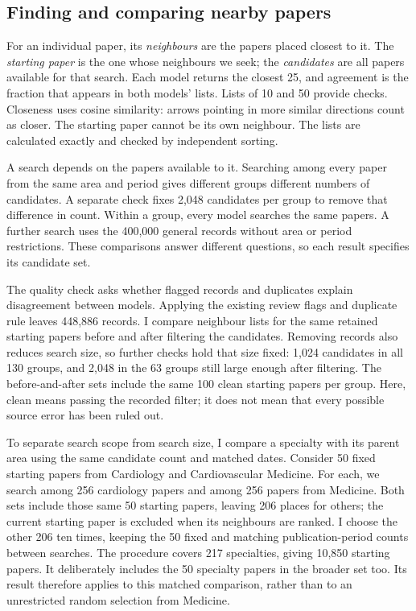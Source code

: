 \documentclass[12pt]{article}
\begin{document}
\subsection{Finding and comparing nearby papers}
For an individual paper, its \emph{neighbours} are the papers placed closest to it. The \emph{starting paper} is the one whose neighbours we seek; the \emph{candidates} are all papers available for that search. Each model returns the closest 25, and agreement is the fraction that appears in both models' lists. Lists of 10 and 50 provide checks. Closeness uses cosine similarity: arrows pointing in more similar directions count as closer. The starting paper cannot be its own neighbour. The lists are calculated exactly and checked by independent sorting.

A search depends on the papers available to it. Searching among every paper from the same area and period gives different groups different numbers of candidates. A separate check fixes 2,048 candidates per group to remove that difference in count. Within a group, every model searches the same papers. A further search uses the 400,000 general records without area or period restrictions. These comparisons answer different questions, so each result specifies its candidate set.

The quality check asks whether flagged records and duplicates explain disagreement between models. Applying the existing review flags and duplicate rule leaves 448,886 records. I compare neighbour lists for the same retained starting papers before and after filtering the candidates. Removing records also reduces search size, so further checks hold that size fixed: 1,024 candidates in all 130 groups, and 2,048 in the 63 groups still large enough after filtering. The before-and-after sets include the same 100 clean starting papers per group. Here, clean means passing the recorded filter; it does not mean that every possible source error has been ruled out.

To separate search scope from search size, I compare a specialty with its parent area using the same candidate count and matched dates. Consider 50 fixed starting papers from Cardiology and Cardiovascular Medicine. For each, we search among 256 cardiology papers and among 256 papers from Medicine. Both sets include those same 50 starting papers, leaving 206 places for others; the current starting paper is excluded when its neighbours are ranked. I choose the other 206 ten times, keeping the 50 fixed and matching publication-period counts between searches. The procedure covers 217 specialties, giving 10,850 starting papers. It deliberately includes the 50 specialty papers in the broader set too. Its result therefore applies to this matched comparison, rather than to an unrestricted random selection from Medicine.
\end{document}
